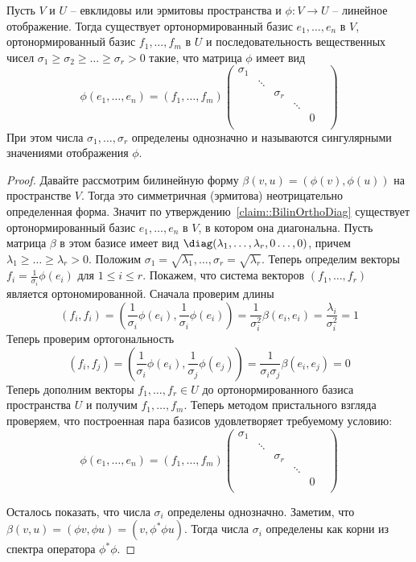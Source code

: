 \begin{claim}
\label{claim::HermEuclHomClass}
Пусть $V$ и $U$ -- евклидовы или эрмитовы пространства и $\phi\colon V\to U$ -- линейное отображение.
Тогда
существует ортонормированный базис $e_1,\ldots,e_n$ в $V$, ортонормированный базис $f_1,\ldots,f_m$ в $U$ и последовательность вещественных чисел $\sigma_1\geqslant \sigma_2 \geqslant \ldots \geqslant \sigma_r > 0$ такие, что матрица $\phi$ имеет вид
\[
\phi(e_1,\ldots,e_n) = (f_1,\ldots,f_m) 
\begin{pmatrix}
{\sigma_1}&{}&{}&{}&{}&{}\\
{}&{\ddots}&{}&{}&{}&{}\\
{}&{}&{\sigma_r}&{}&{}&{}\\
{}&{}&{}&{\ddots}&{}&{}\\
{}&{}&{}&{}&{0}&{}\\
\end{pmatrix}
\]
При этом числа $\sigma_1,\ldots,\sigma_r$ определены однозначно и называются сингулярными значениями отображения $\phi$.
\end{claim}
\begin{proof}
Давайте рассмотрим билинейную форму $\beta(v, u) = (\phi(v), \phi(u))$ на пространстве $V$.
Тогда это симметричная (эрмитова) неотрицательно определенная форма.
Значит по утверждению~\ref{claim::BilinOrthoDiag} существует ортонормированный базис $e_1,\ldots,e_n$ в $V$, в котором она диагональна.
Пусть матрица $\beta$ в этом базисе имеет вид $\diag(\lambda_1,\ldots,\lambda_r,0\ldots,0)$, причем $\lambda_1\geqslant \ldots \geqslant \lambda_r>0$.
Положим $\sigma_1 = \sqrt{\lambda_1},\ldots,\sigma_r = \sqrt{\lambda_r}$.
Теперь определим векторы $f_i = \frac{1}{\sigma_i}\phi(e_i)$ для $1\leqslant i\leqslant r$.
Покажем, что система векторов $(f_1,\ldots,f_r)$ является ортономированной.
Сначала проверим длины
\[
(f_i, f_i) = \left(\frac{1}{\sigma_i}\phi(e_i), \frac{1}{\sigma_i} \phi(e_i)\right) = \frac{1}{\sigma_i^2}\beta(e_i, e_i) = \frac{\lambda_i}{\sigma_i^2} = 1
\]
Теперь проверим ортогональность
\[
(f_i, f_j) = \left(\frac{1}{\sigma_i}\phi(e_i), \frac{1}{\sigma_j} \phi(e_j)\right) = \frac{1}{\sigma_i\sigma_j}\beta(e_i, e_j) = 0
\]
Теперь дополним векторы $f_1,\ldots,f_r\in U$ до ортонормированного базиса пространства $U$ и получим $f_1,\ldots,f_m$.
Теперь методом пристального взгляда проверяем, что построенная пара базисов удовлетворяет требуемому условию:
\[
\phi(e_1,\ldots,e_n) = (f_1,\ldots,f_m) 
\begin{pmatrix}
{\sigma_1}&{}&{}&{}&{}&{}\\
{}&{\ddots}&{}&{}&{}&{}\\
{}&{}&{\sigma_r}&{}&{}&{}\\
{}&{}&{}&{\ddots}&{}&{}\\
{}&{}&{}&{}&{0}&{}\\
\end{pmatrix}
\]

Осталось показать, что числа $\sigma_i$ определены однозначно.
Заметим, что $\beta(v, u) = (\phi v, \phi u) = (v, \phi^* \phi u)$.
Тогда числа $\sigma_i$ определены как корни из спектра оператора $\phi^*\phi$.
\end{proof}

